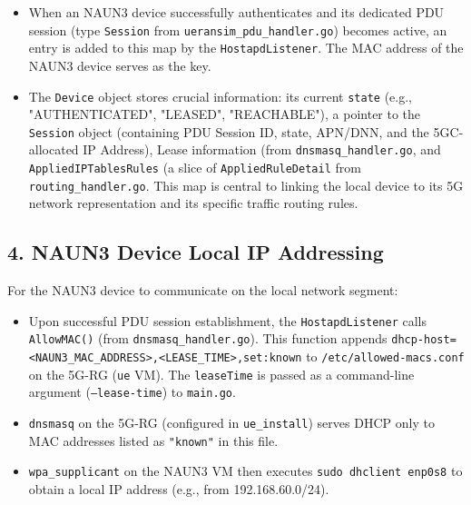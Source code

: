 \begin{itemize}
    \item When an \ac{NAUN3} device successfully authenticates and its dedicated \ac{PDU} session (type \texttt{Session} from \texttt{ueransim\_pdu\_handler.go}) becomes active, an entry is added to this map by the \texttt{HostapdListener}. The \ac{MAC} address of the \ac{NAUN3} device serves as the key.
    
    \item The \texttt{Device} object stores crucial information: its current \texttt{state} (e.g., "AUTHENTICATED", "LEASED", "REACHABLE"), a pointer to the \texttt{Session} object (containing \ac{PDU} Session ID, state, \ac{APN}/\ac{DNN}, and the \ac{5GC}-allocated \ac{IP} Address), Lease information (from \texttt{dnsmasq\_handler.go}, and \texttt{AppliedIPTablesRules} (a slice of \texttt{AppliedRuleDetail} from \texttt{routing\_handler.go}. This map is central to linking the local device to its \ac{5G} network representation and its specific traffic routing rules.
\end{itemize}

\subsection{4. \ac{NAUN3} Device Local \ac{IP} Addressing}

For the \ac{NAUN3} device to communicate on the local network segment:

\begin{itemize}
    \item Upon successful \ac{PDU} session establishment, the \texttt{HostapdListener} calls \texttt{AllowMAC()} (from \texttt{dnsmasq\_handler.go}). This function appends \texttt{dhcp-host=<NAUN3\_MAC\_ADDRESS>,<LEASE\_TIME>,set:known} to \texttt{/etc/allowed-macs.conf} on the \ac{5G-RG} (\texttt{ue} \ac{VM}). The \texttt{leaseTime} is passed as a command-line argument (\texttt{--lease-time}) to \texttt{main.go}.

    \item \texttt{dnsmasq} on the \ac{5G-RG} (configured in \texttt{ue\_install}) serves \ac{DHCP} only to \ac{MAC} addresses listed as \texttt{"known"} in this file.

    \item \texttt{wpa\_supplicant} on the \ac{NAUN3} \ac{VM} then executes \texttt{sudo dhclient enp0s8} to obtain a local \ac{IP} address (e.g., from 192.168.60.0/24).
\end{itemize}

